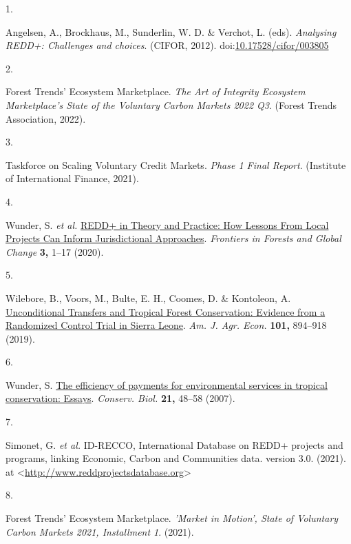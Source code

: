 \documentclass[
]{article}
\newlength{\cslhangindent}
\newlength{\csllabelwidth}
\newlength{\cslentryspacingunit} %
\newenvironment{CSLReferences}[2] %
 {%
  \setlength{\parindent}{0pt}
  \ifodd #1
  \let\oldpar\par
  \def\par{\hangindent=\cslhangindent\oldpar}
  \fi
  \setlength{\parskip}{#2\cslentryspacingunit}
 }%
 {}
\newcommand{\CSLLeftMargin}[1]{\parbox[t]{\csllabelwidth}{#1}}
\newcommand{\CSLRightInline}[1]{\parbox[t]{\linewidth - \csllabelwidth}{#1}\break}
\begin{document}
\hypertarget{refs}{}
\begin{CSLReferences}{0}{0}
\leavevmode{}%
\CSLLeftMargin{1. }%
\CSLRightInline{Angelsen, A., Brockhaus, M., Sunderlin, W. D. \&
Verchot, L. (eds). \emph{{Analysing REDD+: Challenges and choices}}.
(CIFOR, 2012).
doi:\href{https://doi.org/10.17528/cifor/003805}{10.17528/cifor/003805}}

\leavevmode{}%
\CSLLeftMargin{2. }%
\CSLRightInline{Forest Trends' Ecosystem Marketplace. \emph{{The Art of
Integrity Ecosystem Marketplace's State of the Voluntary Carbon Markets
2022 Q3}}. (Forest Trends Association, 2022).}

\leavevmode{}%
\CSLLeftMargin{3. }%
\CSLRightInline{Taskforce on Scaling Voluntary Credit Markets.
\emph{{Phase 1 Final Report}}. (Institute of International Finance,
2021).}

\leavevmode{}%
\CSLLeftMargin{4. }%
\CSLRightInline{Wunder, S. \emph{et al.}
\href{https://doi.org/10.3389/ffgc.2020.00011}{{REDD+ in Theory and
Practice: How Lessons From Local Projects Can Inform Jurisdictional
Approaches}}. \emph{Frontiers in Forests and Global Change} \textbf{3,}
1--17 (2020).}

\leavevmode{}%
\CSLLeftMargin{5. }%
\CSLRightInline{Wilebore, B., Voors, M., Bulte, E. H., Coomes, D. \&
Kontoleon, A. \href{https://doi.org/10.1093/ajae/aay105}{{Unconditional
Transfers and Tropical Forest Conservation: Evidence from a Randomized
Control Trial in Sierra Leone}}. \emph{Am. J. Agr. Econ.} \textbf{101,}
894--918 (2019).}

\leavevmode{}%
\CSLLeftMargin{6. }%
\CSLRightInline{Wunder, S.
\href{https://doi.org/10.1111/j.1523-1739.2006.00559.x}{{The efficiency
of payments for environmental services in tropical conservation:
Essays}}. \emph{Conserv. Biol.} \textbf{21,} 48--58 (2007).}

\leavevmode{}%
\CSLLeftMargin{7. }%
\CSLRightInline{Simonet, G. \emph{et al.} {ID-RECCO, International
Database on REDD+ projects and programs, linking Economic, Carbon and
Communities data. version 3.0.} (2021). at
\textless{}\url{http://www.reddprojectsdatabase.org}\textgreater{}}

\leavevmode{}%
\CSLLeftMargin{8. }%
\CSLRightInline{Forest Trends' Ecosystem Marketplace. \emph{{'Market in
Motion', State of Voluntary Carbon Markets 2021, Installment 1}}.
(2021).}


\end{CSLReferences}
\end{document}
